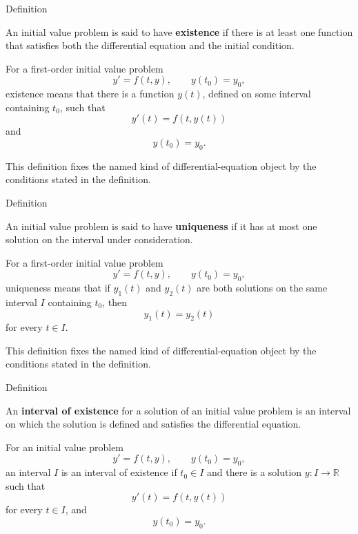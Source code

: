 
\begin{definitionbox}{Definition}
\begin{definition}[Existence]
\label{def:ordinary-differential-equations-solutions-existence}
An initial value problem is said to have \textbf{existence} if there is at least one function that satisfies both the differential equation and the initial condition.

For a first-order initial value problem
\[
y'=f(t,y),
\qquad
y(t_0)=y_0,
\]
existence means that there is a function $y(t)$, defined on some interval containing $t_0$, such that
\[
y'(t)=f(t,y(t))
\]
and
\[
y(t_0)=y_0.
\]
\end{definition}
\end{definitionbox}

\begin{remark*}
This definition fixes the named kind of differential-equation object by the
conditions stated in the definition.
\end{remark*}

\NoLocalDependencies

\begin{definitionbox}{Definition}
\begin{definition}[Uniqueness]
\label{def:ordinary-differential-equations-solutions-uniqueness}
An initial value problem is said to have \textbf{uniqueness} if it has at most one solution on the interval under consideration.

For a first-order initial value problem
\[
y'=f(t,y),
\qquad
y(t_0)=y_0,
\]
uniqueness means that if $y_1(t)$ and $y_2(t)$ are both solutions on the same interval $I$ containing $t_0$, then
\[
y_1(t)=y_2(t)
\]
for every $t\in I$.
\end{definition}
\end{definitionbox}

\begin{remark*}
This definition fixes the named kind of differential-equation object by the
conditions stated in the definition.
\end{remark*}

\NoLocalDependencies

\begin{definitionbox}{Definition}
\begin{definition}
\label{def:ordinary-differential-equations-solutions-interval-of-existence}
An \textbf{interval of existence} for a solution of an initial value problem is an interval on which the solution is defined and satisfies the differential equation.

For an initial value problem
\[
y'=f(t,y),
\qquad
y(t_0)=y_0,
\]
an interval $I$ is an interval of existence if $t_0\in I$ and there is a solution $y:I\to\mathbb{R}$ such that
\[
y'(t)=f(t,y(t))
\]
for every $t\in I$, and
\[
y(t_0)=y_0.
\]
\end{definition}
\end{definitionbox}

